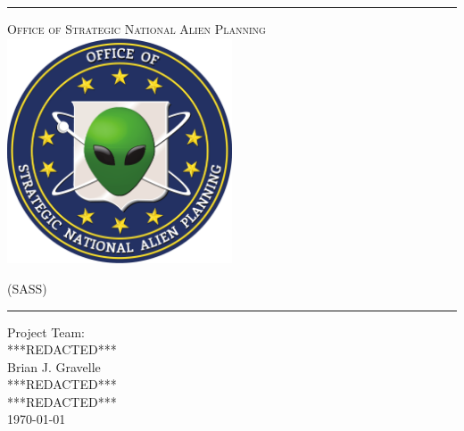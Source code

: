 \begin{titlepage}
\begin{center}

\rule{\linewidth}{0.5mm}

\textsc{\large Office of Strategic National Alien Planning}
~\\[1cm]
\includegraphics[width=0.5\textwidth]{./osnap_logo.pdf}~\\[1cm]

{\Huge \linespread{2}}

\vspace{10pt}

\textsc{\Large (SASS)}

\rule{\linewidth}{0.5mm}

\vfill

Project Team:\\
***REDACTED***\\
Brian J. Gravelle\\
***REDACTED***\\
***REDACTED***\\

\vfill
{\large \today}

\end{center}
\end{titlepage}
